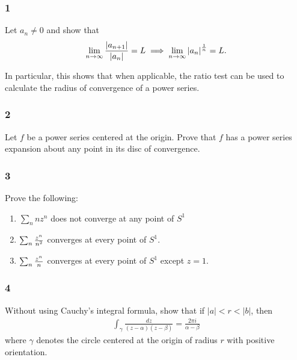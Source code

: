 \hypertarget{section-48}{%
\subsubsection{1}\label{section-48}}

Let \(a_n\neq 0\) and show that
\begin{align*}
\lim_{n\to \infty} {{\left\lvert {a_{n+1}} \right\rvert} \over {\left\lvert {a_n} \right\rvert}} = L \implies \lim_{n\to\infty} {\left\lvert {a_n} \right\rvert}^{1\over n} = L
.\end{align*}

In particular, this shows that when applicable, the ratio test can be
used to calculate the radius of convergence of a power series.

\hypertarget{section-49}{%
\subsubsection{2}\label{section-49}}

Let \(f\) be a power series centered at the origin. Prove that \(f\) has
a power series expansion about any point in its disc of convergence.

\hypertarget{section-50}{%
\subsubsection{3}\label{section-50}}

Prove the following:

\begin{enumerate}
\def\labelenumi{\alph{enumi}.}
\item
  \(\sum_{n} nz^n\) does not converge at any point of \(S^1\)
\item
  \(\sum_n {z^n \over n^2}\) converges at every point of \(S^1\).
\item
  \(\sum_n {z^n \over n}\) converges at every point of \(S^1\) except
  \(z=1\).
\end{enumerate}

\hypertarget{section-51}{%
\subsubsection{4}\label{section-51}}

Without using Cauchy's integral formula, show that if
\({\left\lvert {a} \right\rvert} < r < {\left\lvert {b} \right\rvert}\),
then
\begin{align*}
\int_{\gamma} \frac{d z}{(z-\alpha)(z-\beta)}=\frac{2 \pi i}{\alpha-\beta}
\end{align*}
where \(\gamma\) denotes the circle centered at the origin of radius
\(r\) with positive orientation.

